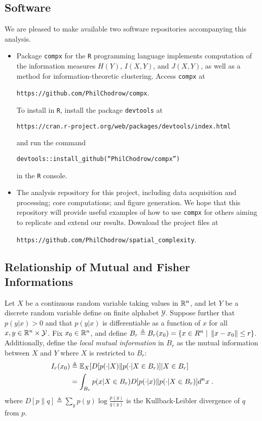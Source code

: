 
\subsection*{Software} 

  We are pleased to make available two software repositories accompanying this analysis. 
  \begin{itemize}
    \item Package 
    \texttt{compx} for the \texttt{R} programming language implements computation of the information measures $H(Y)$, $I(X,Y)$, and $J(X,Y)$, as well as a method for information-theoretic clustering. Access \texttt{compx} at 
    \begin{displayquote}
      \texttt{https://github.com/PhilChodrow/compx}. 
    \end{displayquote}
    To install in \texttt{R}, install the package \texttt{devtools} at 
    \begin{displayquote}
    \texttt{https://cran.r-project.org/web/packages/devtools/index.html}
    \end{displayquote}
     and run the command 
    \begin{displayquote}
      \texttt{devtools::install\_github(``PhilChodrow/compx'')}
    \end{displayquote}
    in the \texttt{R} console. 
    \item The analysis repository for this project, including data acquisition and processing; core computations; and figure generation. We hope that this repository will provide useful examples of how to use \texttt{compx} for others aiming to replicate and extend our results. Download the project files at 
    \begin{displayquote}
      \texttt{https://github.com/PhilChodrow/spatial\_complexity}. 
    \end{displayquote}
  \end{itemize}

\subsection*{Relationship of Mutual and Fisher Informations}

	Let $X$ be a continuous random variable taking values in $\mathbb{R}^n$, and let $Y$ be a discrete random variable define on finite alphabet $\mathcal{Y}$. Suppose further that $p(y|x) > 0$ and that $p(y|x)$ is differentiable as a function of $x$ for all $x,y \in \mathbb{R}^n \times \mathcal{Y}$. Fix $x_0 \in \mathbb{R}^n$, and define $B_r \triangleq B_r(x_0) = \{ x \in R^n \;|\; \left\lVert x - x_0\right\rVert \leq r \}$. Additionally, define the \emph{local mutual information} in $B_r$ as the mutual information between $X$ and $Y$ where $X$ is restricted to $B_r$:
		\begin{align}
			I_r(x_0) &\triangleq \mathbb{E}_X[D[p(\cdot|X)\| p(\cdot|X \in B_r)]|X \in B_r] \\
			&= \int_{B_r} p(x|X \in B_r) D[p(\cdot|x)\| p(\cdot|X \in B_r)] d^n x\;.
		\end{align}
		where $D[p\|q] \triangleq \sum_{y} p(y) \log \frac{p(y)}{q(y)}$ is the Kullback-Leibler divergence of $q$ from $p$. 

